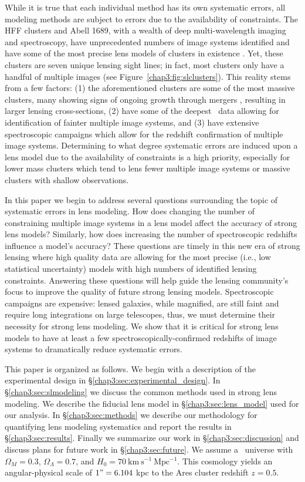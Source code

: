 While it is true that each individual method has its own systematic errors, all modeling methods are subject to errors due to the availability of constraints. The HFF clusters and Abell 1689, with a wealth of deep multi-wavelength imaging and spectroscopy, have unprecedented numbers of image systems identified and have some of the most precise lens models of clusters in existence \citep{Kawamata:2016nr,Treu:2016lr,Jauzac:2016dn,Diego:2015tg,Jauzac:2015xy,Jauzac:2014qd}. Yet, these clusters are seven unique lensing sight lines; in fact, most clusters only have a handful of multiple images (see Figure~\ref{chap3:fig:slclusters}). This reality stems from a few factors: (1) the aforementioned clusters are some of the most massive clusters, many showing signs of ongoing growth through mergers \citep{Jauzac:2015qf,Merten:2011fk}, resulting in larger lensing cross-sections, (2) have some of the deepest \hst\ data allowing for identification of fainter multiple image systems, and (3) have extensive spectroscopic campaigns which allow for the redshift confirmation of multiple image systems. Determining to what degree systematic errors are induced upon a lens model due to the availability of constraints is a high priority, especially for lower mass clusters which tend to lens fewer multiple image systems or massive clusters with shallow observations.

In this paper we begin to address several questions surrounding the topic of systematic errors in lens modeling. How does changing the number of constraining multiple image systems in a lens model affect the accuracy of strong lens models? Similarly, how does increasing the number of spectroscopic redshifts influence a model's accuracy? These questions are timely in this new era of strong lensing where high quality data are allowing for the most precise (i.e., low statistical uncertainty) models with high numbers of identified lensing constraints. Answering these questions will help guide the lensing community's focus to improve the quality of future strong lensing models. Spectroscopic campaigns are expensive: lensed galaxies, while magnified, are still faint and require long integrations on large telescopes, thus, we must determine their necessity for strong lens modeling. We show that it is critical for strong lens models to have at least a few spectroscopically-confirmed redshifts of image systems to dramatically reduce systematic errors.

This paper is organized as follows. We begin with a description of the experimental design in \S\ref{chap3:sec:experimental_design}. In \S\ref{chap3:sec:slmodeling} we discuss the common methods used in strong lens modeling. We describe the fiducial lens model in \S\ref{chap3:sec:lens_model} used for our analysis. In \S\ref{chap3:sec:methods} we describe our methodology for quantifying lens modeling systematics and report the results in \S\ref{chap3:sec:results}. Finally we summarize our work in \S\ref{chap3:sec:discussion} and discuss plans for future work in \S\ref{chap3:sec:future}. We assume a \LCDM\ universe with $\Omega_M=0.3$, $\Omega_\Lambda=0.7$, and $H_0=70\ \mathrm{km\ s^{-1}\ Mpc^{-1}}$. This cosmology yields an angular-physical scale of $1"=6.104$ kpc to the Ares cluster redshift $z=0.5$.


